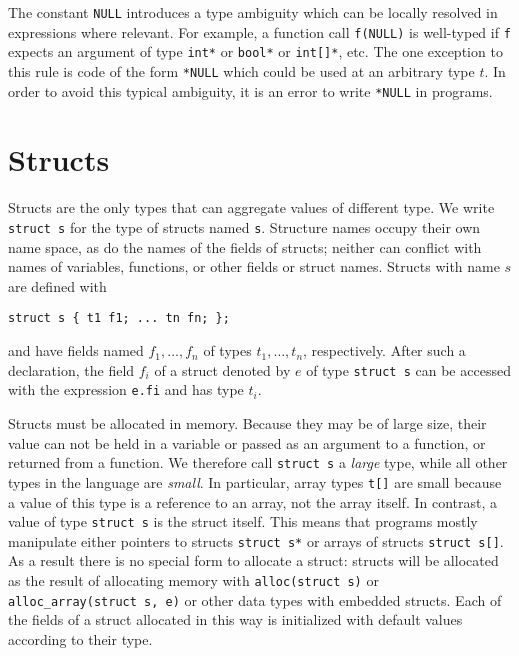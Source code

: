 \documentclass[11pt]{article}
\begin{document}
The constant \lstinline'NULL' introduces a type ambiguity which can be
locally resolved in expressions where relevant.  For example, a
function call \lstinline'f(NULL)' is well-typed if \lstinline'f'
expects an argument of type \lstinline'int*' or \lstinline'bool*' or
\lstinline'int[]*', etc.  The one exception to this rule is code of
the form \lstinline'*NULL' which could be used at an arbitrary type
$t$.  In order to avoid this typical ambiguity, it is an error to
write \lstinline'*NULL' in programs.

\section{Structs}

Structs are the only types that can aggregate values of different
type.  We write \lstinline'struct s' for the type of structs named
\lstinline's'.  Structure names occupy their own name space, as do
the names of the fields of structs; neither can conflict
with names of variables, functions, or other fields or struct
names.  Structs with name $s$ are defined with
\begin{lstlisting}
struct s { t1 f1; ... tn fn; };
\end{lstlisting}
and have fields named $f_1, \ldots, f_n$ of types $t_1, \ldots, t_n$,
respectively.  After such a declaration, the field $f_i$ of a struct
denoted by $e$ of type \lstinline'struct s' can be accessed with the
expression \lstinline'e.fi' and has type $t_i$.

Structs must be allocated in memory.  Because they may be of large
size, their value can not be held in a variable or passed as an
argument to a function, or returned from a function.  We therefore
call \lstinline'struct s' a \emph{large} type, while all other types
in the language are \emph{small}.  In particular, array types
\lstinline't[]' are small because a value of this type is a reference
to an array, not the array itself.  In contrast, a value of type
\lstinline'struct s' is the struct itself.  This means that programs
mostly manipulate either pointers to structs \lstinline'struct s*'
or arrays of structs \lstinline'struct s[]'.  As a result there is
no special form to allocate a struct: structs will be allocated
as the result of allocating memory with \lstinline'alloc(struct s)' or
\lstinline'alloc_array(struct s, e)' or other data types with embedded
structs.  Each of the fields of a struct allocated in this way
is initialized with default values according to their type.
\end{document}
